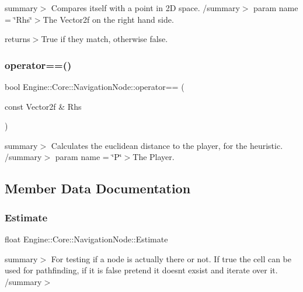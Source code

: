 summary$>$ Compares itself with a point in 2D space. /summary$>$ param name = \char`\"{}\+Rhs\char`\"{}$>$The Vector2f on the right hand side.

returns$>$True if they match, otherwise false.\mbox{\label{struct_engine_1_1_core_1_1_navigation_node_a4093291628771c2de79b2b1a8ea2ec82}} 
\subsubsection{\texorpdfstring{operator==()}{operator==()}\hspace{0.1cm}{\footnotesize\ttfamily [2/2]}}
{\footnotesize\ttfamily bool Engine\+::\+Core\+::\+Navigation\+Node\+::operator== (\begin{DoxyParamCaption}\item[{const Vector2f \&}]{Rhs }\end{DoxyParamCaption})}

summary$>$ Calculates the euclidean distance to the player, for the heuristic. /summary$>$ param name = \char`\"{}\+P\char`\"{}$>$The Player.

\subsection{Member Data Documentation}
\mbox{\label{struct_engine_1_1_core_1_1_navigation_node_a707b571c58bffbf140fd4f6ebe6a4f37}} 
\subsubsection{\texorpdfstring{Estimate}{Estimate}}
{\footnotesize\ttfamily float Engine\+::\+Core\+::\+Navigation\+Node\+::\+Estimate}

summary$>$ For testing if a node is actually there or not. If true the cell can be used for pathfinding, if it is false pretend it doesn\textquotesingle{}t exsist and iterate over it. /summary$>$ \mbox{\label{struct_engine_1_1_core_1_1_navigation_node_a09e7506d996f8bd91b478f3e013fd48e}} 
